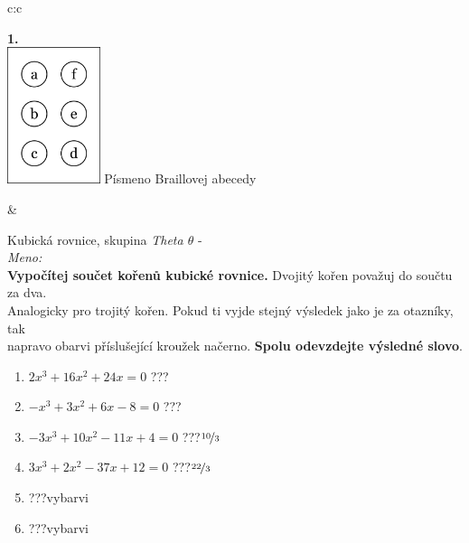 \documentclass[10pt]{report}
\begin{document}
\begin{tabular}{c:c}
\begin{minipage}[c][99mm][t]{0.49\linewidth}
\begin{center}
\begin{minipage}{0.20\linewidth}
\begin{center}
{\Huge\bfseries 1.} \\[2mm]
\includegraphics[height=40mm]{../images/braille.png}
{\small Písmeno Braillovej abecedy}
\end{center}
\end{minipage}
\end{center}
\end{minipage}
&
\begin{minipage}[c][99mm][t]{0.49\linewidth}
\begin{center}
\vspace{7mm}
{\huge Kubická rovnice, skupina \textit{Theta $\theta$} -}\\[4.5mm]
\textit{Meno:}\phantom{xxxxxxxxxxxxxxxxxxxxxxxxxxxxxxxxxxxxxxxxxxxxxxxxxxxxxxxxxxxxxxxxx}\\[3.5mm]
\textbf{Vypočítej součet kořenů kubické rovnice.} Dvojitý kořen považuj do součtu za dva.\\Analogicky pro trojitý kořen. Pokud ti vyjde stejný výsledek jako je za otazníky, tak\\napravo obarvi příslušející kroužek načerno. \textbf{Spolu odevzdejte výsledné slovo}.\\[3mm]
\begin{minipage}{0.77\linewidth}
\begin{center}
\begin{varwidth}{\textwidth}
\begin{enumerate}
\large
\item $2x^3+16x^2+24x=0$\quad \dotfill\; ???\;\dotfill {}
\item $-x^3+3x^2+6x-8=0$\quad \dotfill\; ???\;\dotfill {}
\item $-3x^3+10x^2-11x+4=0$\quad \dotfill\; ???\;\dotfill \quad $\nicefrac{10}{3}$
\item $3x^3+2x^2-37x+12=0$\quad \dotfill\; ???\;\dotfill \quad $\nicefrac{22}{3}$
\item \quad \dotfill\; ???\;\dotfill \quad vybarvi
\item \quad \dotfill\; ???\;\dotfill \quad vybarvi
\end{enumerate}
\end{varwidth}

\end{center}
\end{minipage}
\end{center}
\end{minipage}
\end{tabular}
\end{document}
